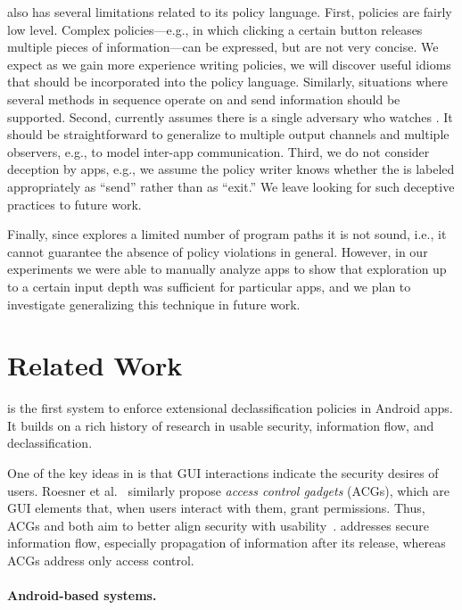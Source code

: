 \toolname{} also has several limitations related to its policy
language. First, \toolname{} policies are fairly low level. Complex
policies---e.g., in which clicking a certain button releases
multiple pieces of information---can be expressed, but are not very
concise. We expect as we gain more experience writing \toolname{}
policies, we will discover useful idioms that should be incorporated
into the policy language.  Similarly, situations where several
methods in sequence operate on and send information should be
supported.  Second, currently \toolname{} assumes there
is a single adversary who watches . It should be
straightforward to generalize to multiple output channels and multiple
observers, e.g., to model inter-app communication.  Third, we do not
consider deception by apps, e.g., we assume the policy writer knows
whether the  is labeled appropriately as ``send'' rather
than as ``exit.'' We leave looking for such deceptive practices to
future work.

Finally, since \toolname{} explores a limited number of program paths
it is not sound, i.e., it cannot guarantee the absence of policy
violations in general. However, in our experiments we were able to
manually analyze apps to show that exploration up to a certain input
depth was sufficient for particular apps, and we plan to investigate
generalizing this technique in future work.

\section{Related Work}
\label{sec:related-work}

\toolname is the first system to enforce extensional declassification policies 
in Android apps.  It builds on a rich history of research in usable security,
information flow, and declassification.

One of the key ideas in \toolname is that GUI interactions indicate the 
security desires of users.
Roesner et al.~\cite{Roesner:12} similarly propose \emph{access control gadgets}
(ACGs), which are GUI elements that, when users interact with them,
grant permissions. 
Thus, ACGs and \toolname both aim to better align 
security with usability~\cite{Yee:04}.
\toolname addresses secure information flow, especially propagation of
information after its release, whereas ACGs address only access control.

\paragraph*{Android-based systems.}

